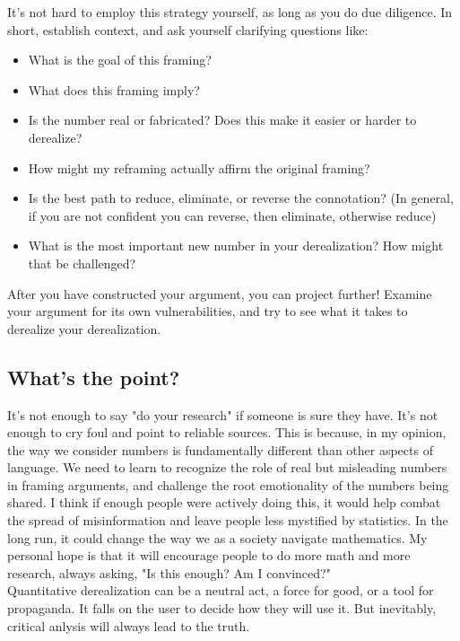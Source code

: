 \documentclass{article}
\begin{document}
\hspace{\parindent}It's not hard to employ this strategy yourself, as long as you do due diligence. In short, establish context, and ask yourself clarifying questions like:

\begin{itemize}
\item What is the goal of this framing?
\item What does this framing imply?
\item Is the number real or fabricated? Does this make it easier or harder to derealize?
\item How might my reframing actually affirm the original framing?
\item Is the best path to reduce, eliminate, or reverse the connotation? (In general, if you are not confident you can reverse, then eliminate, otherwise reduce)
\item What is the most important new number in your derealization? How might that be challenged?
\end{itemize}

After you have constructed your argument, you can project further! Examine your argument for its own vulnerabilities, and try to see what it takes to derealize your derealization.

\subsection*{What's the point?}

\hspace{\parindent}It's not enough to say "do your research" if someone is sure they have. It's not enough to cry foul and point to reliable sources. This is because, in my opinion, the way we consider numbers is fundamentally different than other aspects of language. We need to learn to recognize the role of real but misleading numbers in framing arguments, and challenge the root emotionality of the numbers being shared. I think if enough people were actively doing this, it would help combat the spread of misinformation and leave people less mystified by statistics. In the long run, it could change the way we as a society navigate mathematics. My personal hope is that it will encourage people to do more math and more research, always asking, "Is this enough? Am I convinced?"\\

Quantitative derealization can be a neutral act, a force for good, or a tool for propaganda. It falls on the user to decide how they will use it. But inevitably, critical anlysis will always lead to the truth.
\end{document}
